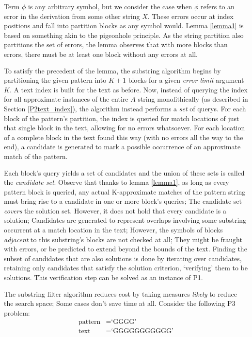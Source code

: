 Term $\phi{}$ is any arbitrary symbol, but we consider the case when $\phi{}$ refers to an \gls{error} in the \gls{derivation} from some other string $X$. These errors occur at index positions and fall into partition \glspl{block} as any symbol would. Lemma \ref{lemma1} is based on something akin to the pigeonhole principle. As the \gls{string partition} also partitions the set of errors, the lemma observes that with more blocks than errors, there must be at least one block without any errors at all. 

To satisfy the precedent of the lemma, the substring algorithm begins by partitioning the given \gls{pattern} into $K+1$ blocks for a given \textit{error limit} argument $K$. A \gls{text index} is built for the \gls{text} as before. Now, instead of querying the index for all approximate instances of the entire $A$ string monolithically (as described in Section \ref{P2text_index}), the algorithm instead performs a \textit{set} of \glspl{query}. For each block of the pattern's partition, the index is queried for \glspl{match location} of just that single block in the text, allowing for no errors whatsoever. For each location of a complete block in the text found this way (with no errors all the way to the end), a \gls{candidate} is generated to mark a possible occurrence of an \gls{approximate match} of the pattern.

Each block’s query yields a set of candidates and the union of these sets is called the \textit{candidate set}. Observe that thanks to lemma \ref{lemma1}, as long as every pattern block is queried, any actual \gls{K-approximate} matches of the pattern string must bring rise to a candidate in one or more block's queries; The candidate set \textit{covers} the solution set. However, it does not hold that every candidate is a \gls{solution}; Candidates are generated to represent overlaps involving some substring occurrent at a match location in the text; However, the symbols of blocks \textit{adjacent} to this substring's blocks are not checked at all; They might be fraught with errors, or be predicted to extend beyond the bounds of the text. Finding the subset of candidates that are also solutions is done by iterating over candidates, retaining only candidates that satisfy the \gls{solution criterion}, `verifying' them to be solutions. This \gls{verification step} can be solved as an instance of P1.
 
The substring filter algorithm reduces cost by taking measures \textit{likely} to reduce the search space; Some cases don’t save time at all. Consider the following P3 problem:
\begin{align*}
\text{pattern}  &= \text{`GGGG'}\\
\text{text} &= \text{`GGGGGGGGGGG'}
\end{align*}

